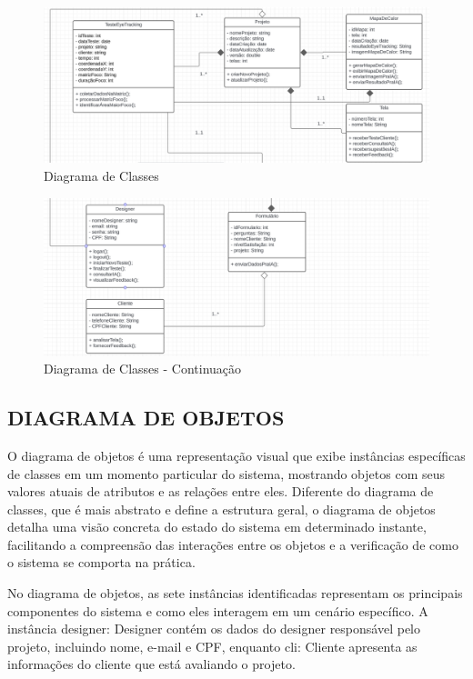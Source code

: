 \begin{figure}[H]
    \centering
    \caption{Diagrama de Classes}%
    \label{fig:pg-classes}
    \includegraphics[width=0.72\linewidth]{Illustrations/classes1.png}
\end{figure}

\vspace{12pt}

\begin{figure}[H]
    \centering
    \caption{Diagrama de Classes - Continuação}%
    \label{fig:pg-classes2}
    \includegraphics[width=0.72\linewidth]{Illustrations/classes2.png}
\end{figure}

\subsection*{DIAGRAMA DE OBJETOS}
O diagrama de objetos é uma representação visual que exibe instâncias específicas de classes em um momento particular do sistema, mostrando objetos com seus valores atuais de atributos e as relações entre eles. Diferente do diagrama de classes, que é mais abstrato e define a estrutura geral, o diagrama de objetos detalha uma visão concreta do estado do sistema em determinado instante, facilitando a compreensão das interações entre os objetos e a verificação de como o sistema se comporta na prática.

No diagrama de objetos, as sete instâncias identificadas representam os principais componentes do sistema e como eles interagem em um cenário específico. A instância designer: Designer contém os dados do designer responsável pelo projeto, incluindo nome, e-mail e CPF, enquanto cli: Cliente apresenta as informações do cliente que está avaliando o projeto.

